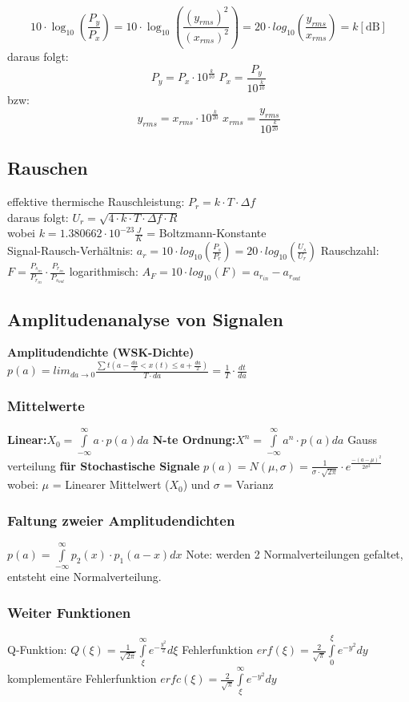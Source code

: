 $$10 \cdot \log_{10} (\frac{P_y}{P_x}) =
  10 \cdot \log_{10}(\frac{(y_{rms})^2}{(x_{rms})^2}) =
  20 \cdot log_{10}(\frac{y_{rms}}{x_{rms}}) = k[\textrm{dB}]$$
daraus folgt:
$$P_y = P_x \cdot 10^{\frac{k}{10}} \; P_x = \frac{P_y}{10^{\frac{k}{10}}}$$
bzw:
$$y_{rms} = x_{rms} \cdot 10^{\frac{k}{20}} \; x_{rms} = \frac{y_{rms}}{10^{\frac{k}{20}}}$$

\subsection{Rauschen}

effektive thermische Rauschleistung: $P_r = k \cdot T \cdot \Delta f $ \\
daraus folgt: $U_r = \sqrt{4\cdot k \cdot T \cdot \Delta f \cdot R} $\\
wobei $k = 1.380662\cdot 10^{-23} \frac{J}{K}$ = Boltzmann-Konstante\\

Signal-Rausch-Verhältnis: $a_r = 10 \cdot log_{10}(\frac{P_s}{P_r}) = 20 \cdot log_{10}(\frac{U_s}{U_r})$
Rauschzahl: $F = \frac{P_{s_{in}}}{P_{r_{in}}}\cdot \frac{P_{r_{in}}}{P_{s_{out}}} $
logarithmisch: $A_F = 10 \cdot log_{10}(F) = a_{r_{in}} - a_{r_{out}}$

\subsection{Amplitudenanalyse von Signalen}

\textbf{Amplitudendichte (WSK-Dichte)} $p(a) = lim_{da \to 0} \frac{\sum t (a-\frac{da}{2} < x(t) \leq a + \frac{da}{2})}{T \cdot da}= \frac{1}{T} \cdot \frac{dt}{da}$ 

\subsubsection*{Mittelwerte}

\textbf{Linear:}$X_0 = \int \limits _{-\infty} ^{\infty} a \cdot p(a) da$
\textbf{N-te Ordnung:}$X^n = \int \limits _{-\infty} ^{\infty} a^n \cdot p(a) da$
Gauss verteilung \textbf{für Stochastische Signale} $p(a) = N(\mu, \sigma) = \frac{1}{\sigma \cdot \sqrt{2\pi}}\cdot e^{\frac{-(a-\mu)^2}{2\sigma^2}} $
wobei: $\mu$ = Linearer Mittelwert ($X_0$) und $\sigma$ = Varianz

\subsubsection*{Faltung zweier Amplitudendichten}

$p(a) = \int \limits _{-\infty} ^{\infty} p_2(x) \cdot p_1(a-x)dx$
Note: werden 2 Normalverteilungen gefaltet, entsteht eine Normalverteilung.

\subsubsection*{Weiter Funktionen}


Q-Funktion: $Q(\xi) = \frac{1}{\sqrt{2\pi}}\int \limits _{\xi} ^{\infty} e^{-\frac{y^2}{2}}d\xi$
Fehlerfunktion $erf(\xi) = \frac{2}{\sqrt{\pi}} \int \limits _{0} ^{\xi} e^{-y^2} dy$
komplementäre Fehlerfunktion $erfc(\xi) =  \frac{2}{\sqrt{\pi}} \int \limits _{\xi} ^{\infty} e^{-y^2} dy $